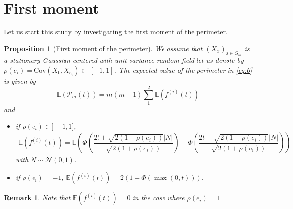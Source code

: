 \documentclass[12pt]{article}
\theoremstyle{Theorem}
\newtheorem{Proposition}[Theorem]{Proposition}
\newtheorem{remark}{Remark}
\begin{document}
\section{First moment}
Let us start this study by investigating the first moment of the perimeter.
\begin{Proposition}[First moment of the perimeter] 
\label{propFisrtmoment}
We assume that $\left(X_x \right)_{x \in G_{m}}$ is a stationary Gaussian centered with unit variance random field let us denote \linebreak by  $\rho(e_i) = \text{Cov}\left(X_{\scriptscriptstyle 0}, X_{e_i}\right) \in~[-1, 1]$. The expected value of the perimeter in \eqref{eq:6} is  given \linebreak by $$\mathbb{E}\left(\mathcal{P}_{m}(t)\right) = m(m-1)\sum_{1}^{2}\mathbb{E}\left(f^{(i)}(t) \right)$$  and
\begin{itemize}
  \item if $\rho(e_{i}) \in ]-1,1]$, 
    {\small
  \begin{align}
  \label{propEquationFisrtmoment}
  \mathbb{E}\left(f^{(i)}(t) \right) = \mathbb{E}\left(\Phi\left(\dfrac{2t + \sqrt{2(1-\rho(e_i))}|N|}{\sqrt{2(1+\rho(e_i))}}\right)  - \Phi\left(\dfrac{2t - \sqrt{2(1-\rho(e_i))}|N|}{\sqrt{2(1+\rho(e_i))}}\right)\right)
  \end{align}}
with $N \sim \mathcal{N}(0,1)$. 
\item if $\rho(e_i) = -1, \; \mathbb{E}\left(f^{(i)}(t) \right)= 2\left(1 - \Phi\left(\max\left(0,t\right)\right)\right).$
  \end{itemize}
\end{Proposition}
\begin{remark}
Note that $\mathbb{E}\left(f^{(i)}(t) \right) = 0$ in the case where $\rho(e_i) = 1$ 
\end{remark}
\end{document}
